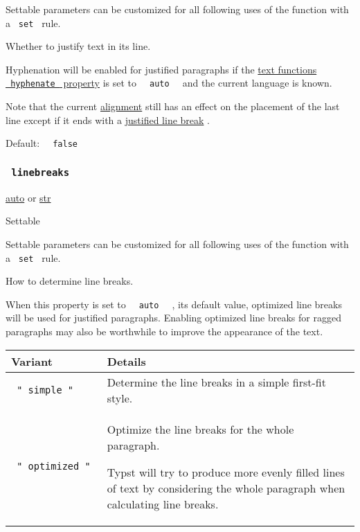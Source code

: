\label{parameters-justify-settable-tooltip}
Settable parameters can be customized for all following uses of the
function with a \texttt{\ set\ } rule.

Whether to justify text in its line.

Hyphenation will be enabled for justified paragraphs if the
\href{/docs/reference/text/text/\#parameters-hyphenate}{text
function\textquotesingle s \texttt{\ hyphenate\ } property} is set to
\texttt{\ }{\texttt{\ auto\ }}\texttt{\ } and the current language is
known.

Note that the current
\href{/docs/reference/layout/align/\#parameters-alignment}{alignment}
still has an effect on the placement of the last line except if it ends
with a
\href{/docs/reference/text/linebreak/\#parameters-justify}{justified
line break} .

Default: \texttt{\ }{\texttt{\ false\ }}\texttt{\ }

\subsubsection{\texorpdfstring{\texttt{\ linebreaks\ }}{ linebreaks }}\label{parameters-linebreaks}

\href{/docs/reference/foundations/auto/}{auto} {or}
\href{/docs/reference/foundations/str/}{str}

{{ Settable }}

\label{parameters-linebreaks-settable-tooltip}
Settable parameters can be customized for all following uses of the
function with a \texttt{\ set\ } rule.

How to determine line breaks.

When this property is set to \texttt{\ }{\texttt{\ auto\ }}\texttt{\ } ,
its default value, optimized line breaks will be used for justified
paragraphs. Enabling optimized line breaks for ragged paragraphs may
also be worthwhile to improve the appearance of the text.

\begin{longtable}[]{@{}
  >{\raggedright\arraybackslash}p{}
  >{\raggedright\arraybackslash}p{}@{}}
\toprule\noalign{}
\begin{minipage}[b]{\linewidth}\raggedright
Variant
\end{minipage} & \begin{minipage}[b]{\linewidth}\raggedright
Details
\end{minipage} \\
\midrule\noalign{}
\endhead
\bottomrule\noalign{}
\endlastfoot
\texttt{\ "\ simple\ "\ } & Determine the line breaks in a simple
first-fit style. \\
\texttt{\ "\ optimized\ "\ } & Optimize the line breaks for the whole
paragraph.

Typst will try to produce more evenly filled lines of text by
considering the whole paragraph when calculating line breaks. \\
\end{longtable}

